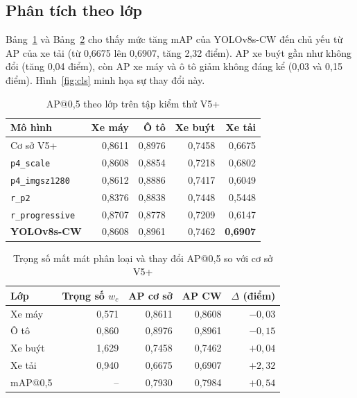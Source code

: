 \documentclass[10pt,journal,letterpaper]{IEEEtran}
\begin{document}
\subsection{Phân tích theo lớp}
Bảng~\ref{tab:cls} và Bảng~\ref{tab:w} cho thấy mức tăng mAP của YOLOv8s-CW đến chủ yếu từ AP của xe tải (từ 0,6675 lên 0,6907, tăng 2,32 điểm). AP xe buýt gần như không đổi (tăng 0,04 điểm), còn AP xe máy và ô tô giảm không đáng kể (0,03 và 0,15 điểm). Hình~\ref{fig:cls} minh họa sự thay đổi này.

\begin{table}[!t]
\caption{AP@0,5 theo lớp trên tập kiểm thử V5+}
\label{tab:cls}
\centering
\footnotesize
\begin{tabular}{lrrrr}
\toprule
Mô hình & Xe máy & Ô tô & Xe buýt & Xe tải \\
\midrule
Cơ sở V5+ & 0,8611 & 0,8976 & 0,7458 & 0,6675 \\
\texttt{p4\_scale} & 0,8608 & 0,8854 & 0,7218 & 0,6802 \\
\texttt{p4\_imgsz1280} & 0,8612 & 0,8886 & 0,7417 & 0,6049 \\
\texttt{r\_p2} & 0,8376 & 0,8838 & 0,7448 & 0,5448 \\
\texttt{r\_progressive} & 0,8707 & 0,8778 & 0,7209 & 0,6147 \\
\textbf{YOLOv8s-CW} & 0,8608 & 0,8961 & 0,7462 & \textbf{0,6907} \\
\bottomrule
\end{tabular}
\end{table}

\begin{table}[!t]
\caption{Trọng số mất mát phân loại và thay đổi AP@0,5 so với cơ sở V5+}
\label{tab:w}
\centering
\footnotesize
\begin{tabular}{lrrrr}
\toprule
Lớp & Trọng số $w_c$ & AP cơ sở & AP CW & $\Delta$ (điểm) \\
\midrule
Xe máy & 0,571 & 0,8611 & 0,8608 & $-0{,}03$ \\
Ô tô & 0,860 & 0,8976 & 0,8961 & $-0{,}15$ \\
Xe buýt & 1,629 & 0,7458 & 0,7462 & $+0{,}04$ \\
Xe tải & 0,940 & 0,6675 & 0,6907 & $+2{,}32$ \\
\midrule
mAP@0,5 & -- & 0,7930 & 0,7984 & $+0{,}54$ \\
\bottomrule
\end{tabular}
\end{table}
\end{document}
